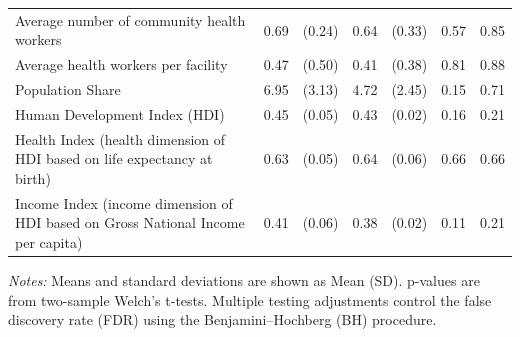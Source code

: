 \documentclass[12pt]{article}
\begin{document}
\begin{table}[t]
{\begin{tabular}{lcccccc}
Average number of community health workers & 0.69 & (0.24) & 0.64 & (0.33) & 0.57 & 0.85 \\
Average health workers per facility & 0.47 & (0.50) & 0.41 & (0.38) & 0.81 & 0.88 \\
Population Share & 6.95 & (3.13) & 4.72 & (2.45) & 0.15 & 0.71 \\
\hline
Human Development Index (HDI) & 0.45 & (0.05) & 0.43 & (0.02) & 0.16 & 0.21 \\
Health Index (health dimension of HDI based on life expectancy at birth) & 0.63 & (0.05) & 0.64 & (0.06) & 0.66 & 0.66\\
Income Index (income dimension of HDI based on Gross National Income per capita) & 0.41 & (0.06) & 0.38 & (0.02) & 0.11 & 0.21\\
\bottomrule
\end{tabular}
}
\begin{minipage}{\textwidth}
\footnotesize
\textit{Notes:} Means and standard deviations are shown as Mean (SD). p-values are from two-sample Welch’s t-tests. Multiple testing adjustments control the false discovery rate (FDR) using the Benjamini–Hochberg (BH) procedure.
\end{minipage}
\end{table}
\end{document}
